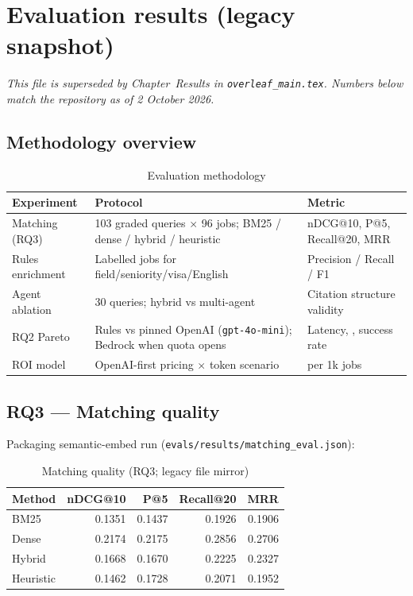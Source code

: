 
\chapter{Evaluation results (legacy snapshot)}
\label{ch:evaluation-legacy}

\noindent\textit{This file is superseded by Chapter~Results in \texttt{overleaf\_main.tex}. Numbers below match the repository as of 2 October 2026.}

\section{Methodology overview}

\begin{table}[ht]
\centering
\caption{Evaluation methodology}
\label{tab:method-legacy}
\begin{tabularx}{\textwidth}{@{}lXX@{}}
\toprule
\textbf{Experiment} & \textbf{Protocol} & \textbf{Metric} \\
\midrule
Matching (RQ3) & 103 graded queries $\times$ 96 jobs; BM25 / dense / hybrid / heuristic & nDCG@10, P@5, Recall@20, MRR \\
Rules enrichment & Labelled jobs for field/seniority/visa/English & Precision / Recall / F1 \\
Agent ablation & 30 queries; hybrid vs multi-agent & Citation structure validity \\
RQ2 Pareto & Rules vs pinned OpenAI (\texttt{gpt-4o-mini}); Bedrock when quota opens & Latency, \EUR{}, success rate \\
ROI model & OpenAI-first pricing $\times$ token scenario & \EUR{} per 1k jobs \\
\bottomrule
\end{tabularx}
\end{table}

\section{RQ3 --- Matching quality}

Packaging semantic-embed run (\texttt{evals/results/matching\_eval.json}):

\begin{table}[ht]
\centering
\caption{Matching quality (RQ3; legacy file mirror)}
\label{tab:rq3-legacy}
\begin{tabular}{@{}lrrrr@{}}
\toprule
\textbf{Method} & \textbf{nDCG@10} & \textbf{P@5} & \textbf{Recall@20} & \textbf{MRR} \\
\midrule
BM25 & 0.1351 & 0.1437 & 0.1926 & 0.1906 \\
Dense & 0.2174 & 0.2175 & 0.2856 & 0.2706 \\
Hybrid & 0.1668 & 0.1670 & 0.2225 & 0.2327 \\
Heuristic & 0.1462 & 0.1728 & 0.2071 & 0.1952 \\
\bottomrule
\end{tabular}
\end{table}

